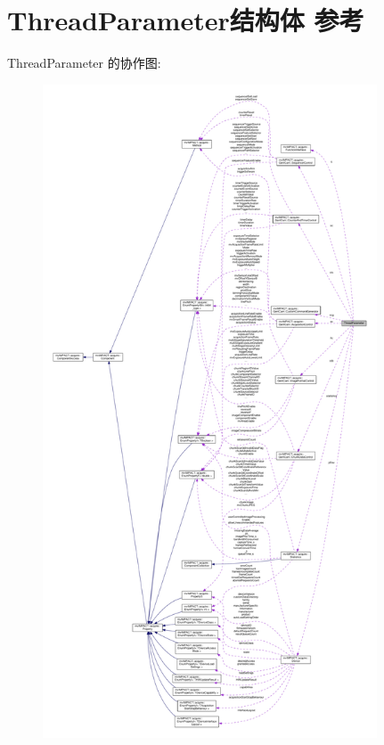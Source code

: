 \hypertarget{class_thread_parameter}{\section{Thread\+Parameter结构体 参考}
\label{class_thread_parameter}
}


Thread\+Parameter 的协作图\+:
\nopagebreak
\begin{figure}[H]
\begin{center}
\leavevmode
\includegraphics[height=550pt]{class_thread_parameter__coll__graph}
\end{center}
\end{figure}

